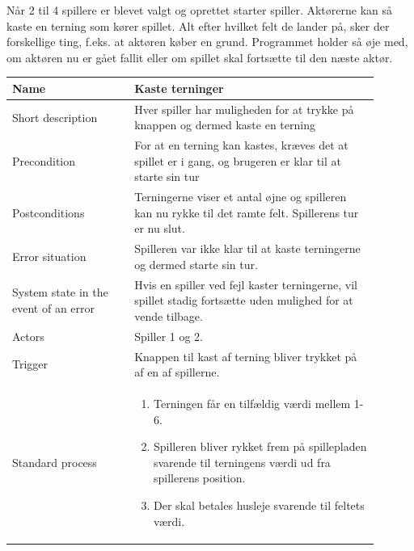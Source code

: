         Når 2 til 4 spillere er blevet valgt og oprettet starter spiller. Aktørerne kan så kaste en terning som kører spillet. Alt efter hvilket felt de lander på, sker der forskellige ting, f.eks. at aktøren køber en grund. Programmet holder så øje med, om aktøren nu er gået fallit eller om spillet skal fortsætte til den næste aktør.

            

            
        \begin{table}[H]
        \centering
        \begin{tabular}{|p{0.3\linewidth} | p{0.6\linewidth}|} 
        \hline
        \textbf{Name}                         &\textbf{ Kaste terninger}  \\ 
        \hline
        Short description                     & Hver spiller har muligheden for at trykke på knappen og dermed kaste en terning\\ 
        \hline
        Precondition                          & For at en terning kan kastes, kræves det at spillet er i gang, og brugeren er klar til at starte sin tur\\ 
        \hline
        Postconditions                        & Terningerne viser et antal øjne og spilleren kan nu rykke til det ramte felt. Spillerens tur er nu slut.\\ 
        \hline
        Error situation                       & Spilleren var ikke klar til at kaste terningerne og dermed starte sin tur.\\ 
        \hline
        System state in the event of an error & Hvis en spiller ved fejl kaster terningerne, vil spillet stadig fortsætte uden mulighed for at vende tilbage.\\ 
        \hline
        Actors                                & Spiller 1 og 2.\\ 
        \hline
        Trigger                               & Knappen til kast af terning bliver trykket på af en af spillerne. \\ 
        \hline
        
        Standard process                      & 
        \begin{enumerate}
        \item Terningen får en tilfældig værdi mellem 1-6.
        \item Spilleren bliver rykket frem på spillepladen svarende til terningens værdi ud fra spillerens position.
        \item Der skal betales husleje svarende til feltets værdi.
        \end{enumerate}
        \\ 
        \hline
        

\end{tabular}
\end{table}
